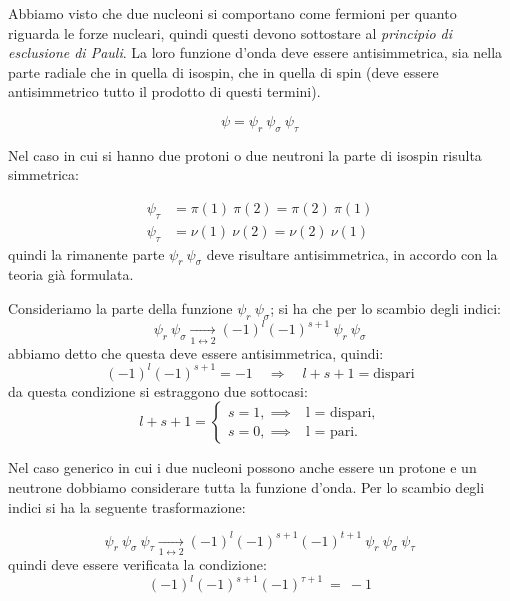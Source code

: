 \breaknote

Abbiamo  visto che due nucleoni si comportano come
fermioni per quanto riguarda le forze nucleari, quindi questi devono sottostare
al \textit{principio di esclusione di Pauli}.
La loro funzione d'onda deve essere antisimmetrica, sia nella parte radiale che
in quella di isospin, che in quella di spin (deve essere antisimmetrico tutto il
prodotto di questi termini).

\begin{equation*}
\psi = \psi_r  \ \psi_\sigma \ \psi_\tau
\end{equation*}

Nel caso in cui si hanno due protoni o due neutroni la parte di isospin risulta
simmetrica:

\begin{align*}
\psi_\tau &= \pi(1) \ \pi(2) = \pi(2) \ \pi(1) \\
\psi_\tau &= \nu(1) \ \nu(2) = \nu(2) \ \nu(1)
\end{align*}
quindi la rimanente parte $\psi_r \ \psi_\sigma$ deve risultare antisimmetrica,
in accordo con la teoria già formulata.

Consideriamo la parte della funzione $\psi_r \ \psi_\sigma$; si ha che per lo
scambio degli indici:
\begin{equation*}
\psi_r \ \psi_\sigma \xrightarrow[1\leftrightarrow2]{} (-1)^l (-1)^{s+1} \ 
\psi_r \ \psi_\sigma
\end{equation*}
abbiamo detto che questa deve essere antisimmetrica, quindi:
\begin{equation*}
  (-1)^l (-1)^{s+1} = -1 \quad \Longrightarrow \quad l+s+1 = \text{dispari}
\end{equation*}
da questa condizione si estraggono due sottocasi:
\begin{equation*}
l+s+1=
\begin{cases}
s=1,      \implies & \text{l \ = \ dispari,} \\
s=0, 	     \implies& \text{l \ = \ pari.}
\end{cases}
\end{equation*}

Nel caso generico in cui i due nucleoni possono anche essere un protone e un
neutrone dobbiamo considerare tutta la funzione d'onda. 
Per lo scambio degli indici si ha la seguente trasformazione:

\begin{equation*}
\psi_r \ \psi_\sigma \ \psi_\tau  \xrightarrow[1\leftrightarrow2]{} (-1)^l 
(-1)^{s+1} (-1)^{t +1}  \ \psi_r \ \psi_\sigma \ \psi_\tau
\end{equation*}
quindi deve essere verificata la condizione:
\begin{equation*}
(-1)^l (-1)^{s+1} (-1)^{\tau +1} \ = \ -1
\end{equation*}

